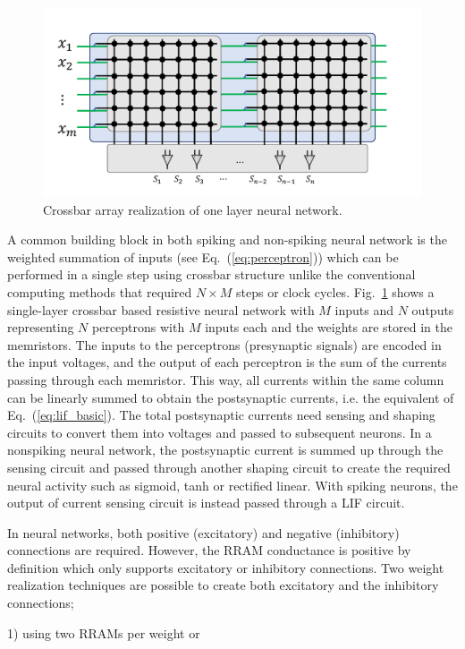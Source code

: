 \documentclass[english]{article}
\renewcommand{\refeq}[1]{{Eq.~(\ref{#1})}}
\newcommand{\reffig}[1]{{Fig.~\ref{#1}}}
\renewcommand{\cite}{\citep}
\begin{document}
\begin{figure}[!h]
\centering
\includegraphics[width=0.8\linewidth]{SingleLayer.pdf}%

\caption{\label{fig:crossbar_array} Crossbar array realization of one layer neural network.}
\end{figure}


A common building block in both spiking and non-spiking neural network is the weighted summation of inputs (see \refeq{eq:perceptron}) which can be performed in a single step using crossbar structure unlike the conventional computing methods that required $N\times M$ steps or clock cycles. 
\reffig{fig:crossbar_array} shows a single-layer crossbar based resistive neural network with $M$ inputs and $N$ outputs representing $N$ perceptrons with $M$ inputs each and the weights are stored in the memristors. 
The inputs to the perceptrons (presynaptic signals) are encoded in the input voltages, and the output of each perceptron is the sum of the currents passing through each memristor. 
This way, all currents within the same column can be linearly summed to obtain the postsynaptic currents, i.e. the equivalent of \refeq{eq:lif_basic}.
The total postsynaptic currents need sensing and shaping circuits to convert them into voltages and passed to subsequent neurons. In a nonspiking neural network, the postsynaptic current is summed up through the sensing circuit and passed through another shaping circuit to create the required neural activity such as sigmoid, tanh or rectified linear.  
With spiking neurons, the output of current sensing circuit is instead passed through a \ac{LIF} circuit.

In neural networks, both positive (excitatory) and negative (inhibitory) connections are required. 
However, the RRAM conductance is positive by definition which only supports excitatory or inhibitory connections. 
Two weight realization techniques are possible to create both excitatory and the inhibitory connections; 

1) using two RRAMs per weight \cite{prezioso2015training,li2018efficient} or
\end{document}

